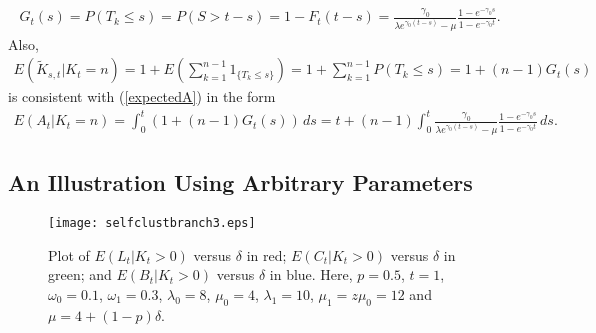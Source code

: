 \documentclass[a4paper,11pt]{article}
\theoremstyle{plain}
\theoremstyle{definition}
\numberwithin{equation}{section}
\begin{document}
\begin{align*}
G_t(s)=P(T_k\le s)=P(S> t-s)=1-F_t(t-s)
=\frac{\gamma_0}{\lambda
  e^{\gamma_0(t-s)}-\mu} \frac{1-e^{-\gamma_0 s}}{1-e^{-\gamma_0 t}}.
\end{align*}
\noindent Also,
\begin{align}
E(\widetilde K_{s,t}|K_t=n)=1+E(\sum_{k=1}^{n-1} 1_{\{T_k\le s\}})=
 1+\sum_{k=1}^{n-1} P(T_k\le s)
   =1+(n-1)G_t(s)
    \label{fixed}
\end{align}
\noindent is consistent with (\ref{expectedA}) in the form
\begin{align} 
E(A_t|K_t=n)=\int_0^t (1+(n-1)G_t(s))\,ds
 =t+(n-1)\int_0^t 
   \frac{\gamma_0}{\lambda
  e^{\gamma_0(t-s)}-\mu} \frac{1-e^{-\gamma_0 s}}{1-e^{-\gamma_0
    t}}\,ds.
\label{Ebranchlengthgiven_n}
\end{align}



\subsection*{An Illustration Using Arbitrary Parameters}

\begin{figure*}[!t]
\centerline{
\texttt{[image: selfclustbranch3.eps]}}
\caption{Plot of $E(L_t|K_t>0)$ versus $\delta$ in red; 
$E(C_t|K_t>0)$ versus $\delta$ in green; and $E(B_t|K_t>0)$ 
versus $\delta$ in blue. Here, $p=0.5$, $t=1$, $\omega_0=0.1$, 
$\omega_1=0.3$, $\lambda_0=8$, $\mu_0=4$, $\lambda_1=10$, $\mu_1=z\mu_0=12$ 
and $\mu=4+(1-p)\delta$. }
\label{fig:example}
\end{figure*}
\end{document}
